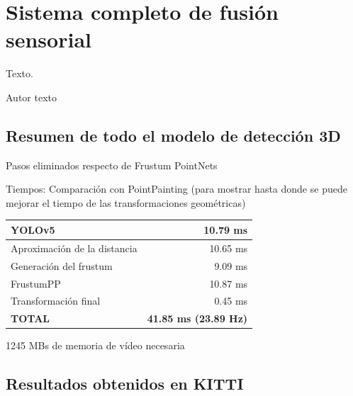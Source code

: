\chapter{Sistema completo de fusión sensorial}
\label{cha:Sistema completo de fusión sensorial}

\begin{FraseCelebre}
  \begin{Frase}
    Texto.
  \end{Frase}
  \begin{Fuente}
    Autor texto
  \end{Fuente}
\end{FraseCelebre}

\section{Resumen de todo el modelo de detección 3D}
\label{sec:Resumen de todo el modelo de detección 3D}

Pasos eliminados respecto de  Frustum PointNets

Tiempos: Comparación con PointPainting (para mostrar hasta donde se puede mejorar el tiempo de las transformaciones geométricas)

\begin{table}[H]
\centering
\begin{tabular}{|lr|}
\hline
YOLOv5                       & 10.79 ms                     \\ \hline
Aproximación de la distancia & 10.65 ms                     \\ \hline
Generación del frustum       & 9.09 ms                      \\ \hline
FrustumPP                    & 10.87 ms                     \\ \hline
Transformación final         & 0.45 ms                      \\ \hline \hline
\textbf{TOTAL}               & \textbf{41.85 ms (23.89 Hz)} \\ \hline
\end{tabular}
\end{table}

1245 MBs de memoria de vídeo necesaria

\section{Resultados obtenidos en KITTI}
\label{sec:Resultados obtenidos en KITTI}

